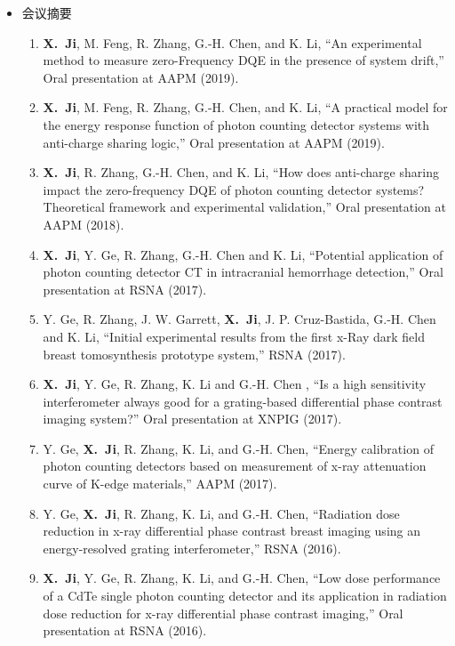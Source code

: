 \documentclass[letterpaper,11pt]{article}
\newcommand{\xji}{\textbf{X.~Ji}}
\begin{document}
\begin{CJK}{UTF8}{song}
\begin{itemize}
\item 会议摘要
\begin{enumerate}\justifying
\item \xji, M. Feng, R. Zhang, G.-H. Chen, and K. Li, ``An experimental method to measure zero-Frequency DQE in the presence of system drift,'' Oral presentation at AAPM (2019).

\item \xji, M. Feng, R. Zhang, G.-H. Chen, and K. Li, ``A practical model for the energy response function of photon counting detector systems with anti-charge sharing logic,'' Oral presentation at AAPM (2019).

\item \xji, R. Zhang, G.-H. Chen, and K. Li, ``How does anti-charge sharing impact the zero-frequency DQE of photon counting detector systems? Theoretical framework and experimental validation,'' Oral presentation at AAPM (2018).

\item \xji, Y. Ge, R. Zhang, G.-H. Chen and K. Li, ``Potential application of photon counting detector CT in intracranial hemorrhage detection,'' Oral presentation at RSNA (2017).

\item Y. Ge, R. Zhang, J. W. Garrett, \xji, J. P. Cruz-Bastida, G.-H. Chen and K. Li, ``Initial experimental results from the first x-Ray dark field breast tomosynthesis prototype system,'' RSNA (2017).

\item \xji, Y. Ge, R. Zhang, K. Li and G.-H. Chen , ``Is a high sensitivity interferometer always good for a grating-based differential phase contrast imaging system?'' Oral presentation at XNPIG (2017).

\item Y. Ge, \xji, R. Zhang, K. Li, and G.-H. Chen, ``Energy calibration of photon counting detectors based on measurement of x-ray attenuation curve of K-edge materials,'' AAPM (2017).

\item Y. Ge, \xji, R. Zhang, K. Li, and G.-H. Chen, ``Radiation dose reduction in x-ray differential phase contrast breast imaging using an energy-resolved grating interferometer,'' RSNA (2016).

\item \xji, Y. Ge, R. Zhang, K. Li, and G.-H. Chen, ``Low dose performance of a CdTe single photon counting detector and its application in radiation dose reduction for x-ray differential phase contrast imaging,'' Oral presentation at RSNA (2016).
\end{enumerate}
\end{itemize}


\end{CJK}
\end{document}
